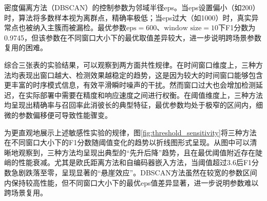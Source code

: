 \begin{table}[htbp]
    \centering
    \label{tab:density_sensitivity}
\end{table}

密度偏离方法（DBSCAN）的控制参数为邻域半径eps。当eps设置偏小（如200）时，算法将多数样本视为离群点，精确率极低；当eps过大（如1000）时，真实异常点也被纳入主簇而被漏检。最优参数$\text{eps}=600$、$\text{window size}=10$下F1分数为0.9745，但该参数在不同窗口大小下的最优取值差异较大，进一步说明跨场景参数复用的困难。

综合三张表的实验结果，可以观察到两方面共性规律。在时间窗口维度上，三种方法均表现出窗口越大、检测效果越稳定的趋势，这是因为较大的时间窗口能够包含更丰富的时序模式信息，有效平滑瞬时噪声的干扰。然而窗口过大也会增加检测延迟，在实际部署中需要在精度和响应速度之间进行权衡。在阈值维度上，三种方法均呈现出精确率与召回率此消彼长的典型特征，最优参数均处于极窄的区间内，细微的参数偏移便可导致性能骤变。

为更直观地展示上述敏感性实验的规律，图\ref{fig:threshold_sensitivity}将三种方法在不同窗口大小下的F1分数随阈值变化的趋势以折线图形式呈现。从图中可以清晰地观察到，三种方法均呈现出典型的``先升后降''趋势，且在最优阈值附近存在陡峭的性能衰减。尤其是欧氏距离方法和自编码器嵌入方法，当阈值超过3.6后F1分数急剧跌落至零，呈现显著的``悬崖效应''。DBSCAN方法虽然在较宽的参数区间内保持较高性能，但不同窗口大小下的最优eps值差异显著，进一步说明参数难以跨场景复用。

